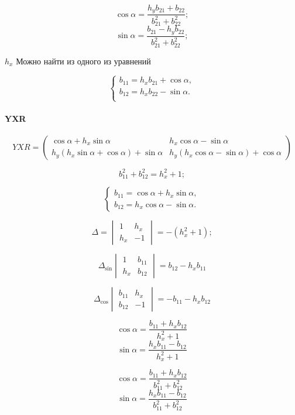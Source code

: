 $$\cos\alpha = \frac{h_y b_{21} + b_{22}}{b_{21}^2 + b_{22}^2};$$
$$\sin\alpha = \frac{b_{21} - h_y b_{22}}{b_{21}^2 + b_{22}^2};$$


$h_x$ Можно найти из одного из уравнений

$$
\begin{cases}
	b_{11} = {h_x} b_{21} + \cos{\alpha},\\
	b_{12} = {h_x} b_{22} - \sin{\alpha}.\\
\end{cases}
$$

\paragraph{YXR}

$$YXR = \begin{pmatrix}
	\cos\alpha + {h_x} \sin\alpha & 
	{h_x} \cos\alpha -\sin\alpha \\
	{h_y}\left( {h_x}\sin\alpha + \cos\alpha\right)  +\sin\alpha & 
	{h_y}\left( {h_x}\cos\alpha - \sin\alpha\right)  +\cos\alpha
\end{pmatrix}$$

$$b_{11}^2 + b_{12}^2 = h_x^2 + 1;$$


$$
\begin{cases}
	b_{11} = \cos\alpha + {h_x} \sin\alpha,\\
	b_{12} = h_x \cos\alpha - \sin{\alpha}.
\end{cases}
$$


$$\Delta = \begin{vmatrix}
	1 & h_x\\
	h_x & -1
\end{vmatrix} = - (h_x^2 + 1);$$

$$\Delta_{\sin}\begin{vmatrix}
	1 & b_{11}\\
	h_x &   b_{12}
\end{vmatrix} = b_{12} -  h_x b_{11}$$

$$\Delta_{\cos}\begin{vmatrix}
	b_{11} & h_x\\
	b_{12} & -1
\end{vmatrix} = -b_{11} - h_x b_{12}$$

$$\cos\alpha = \frac{b_{11} + h_x b_{12}}{h_x^2 + 1}$$
$$\sin\alpha = \frac{h_x b_{11} - b_{12}}{h_x^2 + 1}$$

$$\cos\alpha = \frac{b_{11} + h_x b_{12}}{b_{11}^2 + b_{12}^2}$$
$$\sin\alpha = \frac{h_x b_{11} - b_{12}}{b_{11}^2 + b_{12}^2}$$

